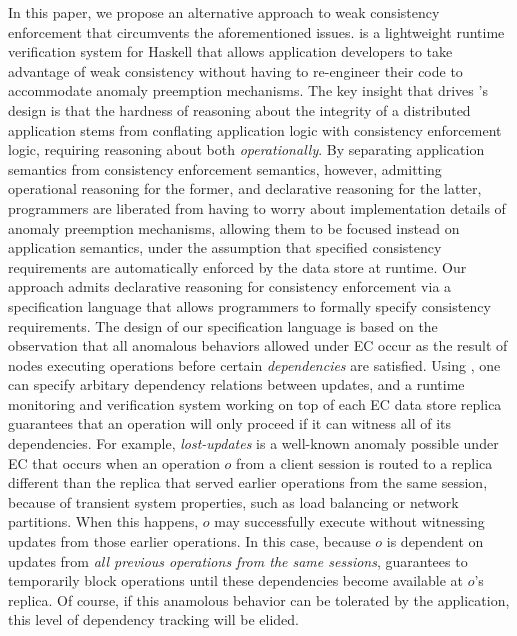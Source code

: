 In this paper, we propose an alternative approach to weak consistency
enforcement that circumvents the aforementioned issues.  \tool is a
lightweight runtime verification system for Haskell that allows
application developers to take advantage of weak consistency without
having to re-engineer their code to accommodate anomaly preemption
mechanisms.  The key insight that drives \tool's design is that the
hardness of reasoning about the integrity of a distributed application
stems from conflating application logic with consistency enforcement
logic, requiring reasoning about both \emph{operationally}.  By
separating application semantics from consistency enforcement
semantics, however, admitting operational reasoning for the former,
and declarative reasoning for the latter, programmers are liberated
from having to worry about implementation details of anomaly
preemption mechanisms, allowing them to be focused instead on
application semantics, under the assumption that specified consistency
requirements are automatically enforced by the data store at runtime.
%
Our approach admits declarative reasoning for consistency enforcement
via a specification language that allows programmers to formally
specify consistency requirements.  The design of our specification
language is based on the observation that all anomalous behaviors
allowed under EC occur as the result of nodes executing operations
before certain \emph{dependencies} are satisfied.  Using \tool, one
can specify arbitary dependency relations between updates, and a
runtime monitoring and verification system working on top of each EC
data store replica guarantees that an operation will only proceed if
it can witness all of its dependencies.  For example,
\emph{lost-updates} is a well-known anomaly possible under EC that
occurs when an operation $o$ from a client session is routed to a
replica different than the replica that served earlier operations from
the same session, because of transient system properties, such as load
balancing or network partitions.  When this happens, $o$ may
successfully execute without witnessing updates from those earlier
operations. In this case, because $o$ is dependent on updates from
\emph{all previous operations from the same sessions}, \tool
guarantees to temporarily block operations until these dependencies
become available at $o$'s replica.  Of course, if this anamolous
behavior can be tolerated by the application, this level of dependency
tracking will be elided.

%
%

